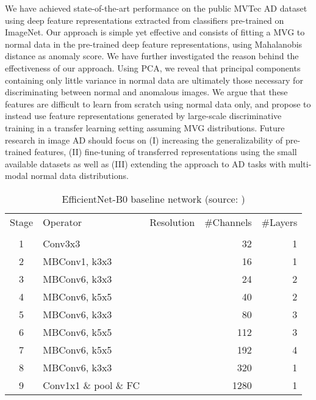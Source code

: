 \documentclass[conference, a4paper]{./template/IEEEtran}
\begin{document}
We have achieved state-of-the-art performance on the public MVTec AD dataset using deep feature representations extracted from classifiers pre-trained on ImageNet.
Our approach is simple yet effective and consists of fitting a MVG to normal data in the pre-trained deep feature representations, using Mahalanobis distance as anomaly score.
We have further investigated the reason behind the effectiveness of our approach.
Using PCA, we reveal that principal components containing only little variance in normal data are ultimately those necessary for discriminating between normal and anomalous images. We argue that these features are difficult to learn from scratch using normal data only, and propose to instead use feature representations generated by large-scale discriminative training in a transfer learning setting assuming MVG distributions.
Future research in image AD should focus on (I) increasing the generalizability of pre-trained features, (II) fine-tuning of transferred representations using the small available datasets as well as (III) extending the approach to AD tasks with multi-modal normal data distributions. 















\cleardoublepage
\appendix


\begin{table}[htbp]
	\caption[EfficientNet-B0 baseline network]{EfficientNet-B0 baseline network (source: \cite{Tan2019})}
	\label{tab:efficient-b0_baseline}
	\centering
	\begin{tabular}{@{}clcrr@{}}
		\toprule
		Stage & Operator & Resolution & \#Channels & \#Layers \\
		 &  &  &  &  \\
		\midrule
		1 & Conv3x3 &  & 32 & 1 \\
		2 & MBConv1, k3x3 &  & 16 & 1 \\
		3 & MBConv6, k3x3 &  & 24 & 2 \\
		4 & MBConv6, k5x5 &  & 40 & 2 \\
		5 & MBConv6, k3x3 &  & 80 & 3 \\
		6 & MBConv6, k5x5 &  & 112 & 3 \\
		7 & MBConv6, k5x5 &  & 192 & 4 \\
		8 & MBConv6, k3x3 &  & 320 & 1 \\
    9 & Conv1x1 \& pool \& FC  &  & 1280 & 1 \\
    \bottomrule
	\end{tabular}
\end{table}
\end{document}
